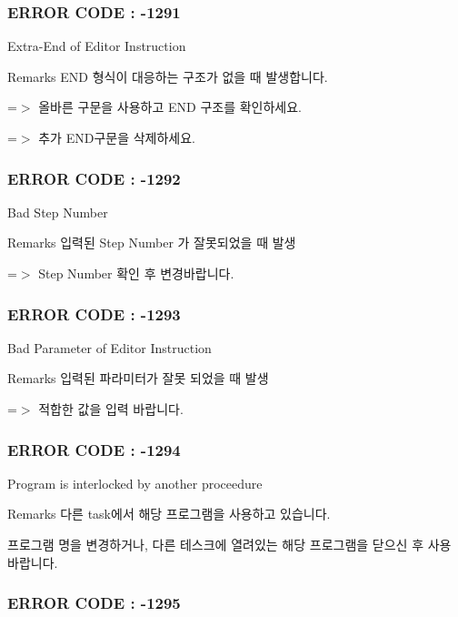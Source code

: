  \subsubsection*{E\-R\-R\-O\-R C\-O\-D\-E \-: -\/1291 }

Extra-\/\-End of Editor Instruction \begin{DoxyRemark}{Remarks}
E\-N\-D 형식이 대응하는 구조가 없을 때 발생합니다. \par
 =$>$ 올바른 구문을 사용하고 E\-N\-D 구조를 확인하세요. \par
 =$>$ 추가 E\-N\-D구문을 삭제하세요.
\end{DoxyRemark}


 \subsubsection*{E\-R\-R\-O\-R C\-O\-D\-E \-: -\/1292 }

Bad Step Number \begin{DoxyRemark}{Remarks}
입력된 Step Number 가 잘못되었을 때 발생 \par
 =$>$ Step Number 확인 후 변경바랍니다.
\end{DoxyRemark}


 \subsubsection*{E\-R\-R\-O\-R C\-O\-D\-E \-: -\/1293 }

Bad Parameter of Editor Instruction \begin{DoxyRemark}{Remarks}
입력된 파라미터가 잘못 되었을 때 발생\par
 =$>$ 적합한 값을 입력 바랍니다.
\end{DoxyRemark}


 \subsubsection*{E\-R\-R\-O\-R C\-O\-D\-E \-: -\/1294 }

Program is interlocked by another proceedure \begin{DoxyRemark}{Remarks}
다른 task에서 해당 프로그램을 사용하고 있습니다.\par
 프로그램 명을 변경하거나, 다른 테스크에 열려있는 해당 프로그램을 닫으신 후 사용 바랍니다.
\end{DoxyRemark}


 \subsubsection*{E\-R\-R\-O\-R C\-O\-D\-E \-: -\/1295 }

